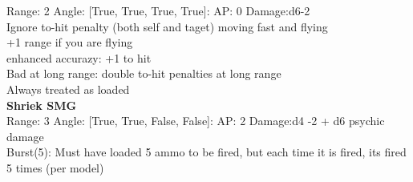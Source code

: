 Range: 2  Angle: [True, True, True, True]: AP: 0 Damage:d6-2 \\
Ignore to-hit penalty (both self and taget) moving fast and flying\\ 
+1 range if you are flying\\ 
enhanced accurazy: +1 to hit\\ 
Bad at long range: double to-hit penalties at long range\\ 
Always treated as loaded\\ 




{\bf Shriek SMG } \\



Range: 3  Angle: [True, True, False, False]: AP: 2 Damage:d4 -2 + d6 psychic damage \\
Burst(5): Must have loaded 5 ammo to be fired, but each time it is fired, its fired 5 times (per model)\\ 




 
\ \\



